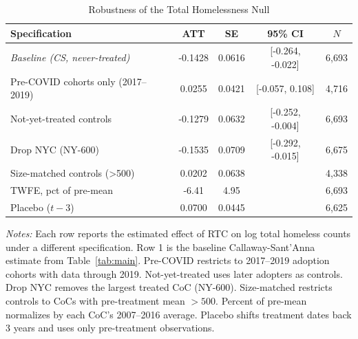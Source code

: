 \begin{table}[htbp]
\centering
\caption{Robustness of the Total Homelessness Null}
\label{tab:robust}
\begin{tabular}{lcccc}
\hline\hline
Specification & ATT & SE & 95\% CI & $N$ \\
\hline
\textit{Baseline (CS, never-treated)} & -0.1428 & 0.0616 & [-0.264, -0.022] & 6,693 \\
Pre-COVID cohorts only (2017--2019) & 0.0255 & 0.0421 & [-0.057, 0.108] & 4,716 \\
Not-yet-treated controls & -0.1279 & 0.0632 & [-0.252, -0.004] & 6,693 \\
Drop NYC (NY-600) & -0.1535 & 0.0709 & [-0.292, -0.015] & 6,675 \\
Size-matched controls (>500) & 0.0202 & 0.0638 & & 4,338 \\
TWFE, pct of pre-mean & -6.41 & 4.95 & & 6,693 \\
Placebo ($t - 3$) & 0.0700 & 0.0445 & & 6,625 \\
\hline\hline
\end{tabular}
\begin{tablenotes}
\item \textit{Notes:} Each row reports the estimated effect of RTC on log total homeless counts under a different specification. Row 1 is the baseline Callaway-Sant'Anna estimate from Table~\ref{tab:main}. Pre-COVID restricts to 2017--2019 adoption cohorts with data through 2019. Not-yet-treated uses later adopters as controls. Drop NYC removes the largest treated CoC (NY-600). Size-matched restricts controls to CoCs with pre-treatment mean $> 500$. Percent of pre-mean normalizes by each CoC's 2007--2016 average. Placebo shifts treatment dates back 3 years and uses only pre-treatment observations.
\end{tablenotes}
\end{table}
